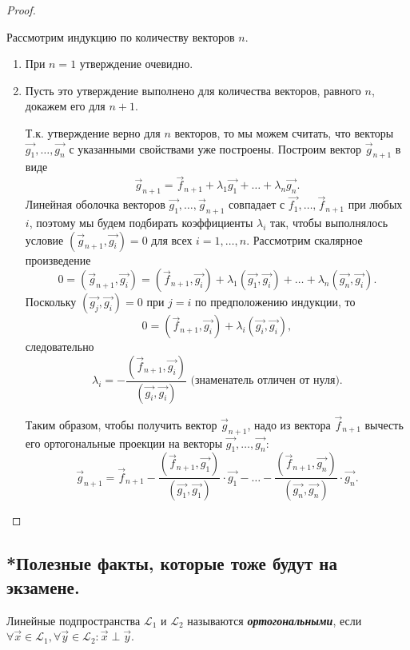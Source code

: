 \begin{proof}~

    Рассмотрим индукцию по количеству векторов $n$.
    \begin{enumerate}
        \item При $n = 1$ утверждение очевидно.
        \item Пусть это утверждение выполнено для количества векторов, равного $n$, докажем его для $n + 1$. 
        
        Т.к. утверждение верно для $n$ векторов, то мы можем считать, что векторы $\vec{g_1}, \ldots, \vec{g_n}$ с указанными свойствами уже построены. Построим вектор $\vec{g}_{n + 1}$ в виде 
        $$\vec{g}_{n + 1} = \vec{f}_{n + 1} + \lambda_1 \vec{g_1} + \ldots + \lambda_n\vec{g_n}.$$ 
        Линейная оболочка векторов $\vec{g_1}, \ldots,  \vec{g}_{n + 1}$ совпадает с $\vec{f_1}, \ldots, \vec{f}_{n + 1}$ при любых $i$, поэтому мы будем подбирать коэффициенты $\lambda_i$ так, чтобы выполнялось условие $(\vec{g}_{n + 1},  \vec{g_i}) = 0$ для всех $i = 1, \ldots, n$. Рассмотрим скалярное произведение $$0 = (\vec{g}_{n + 1}, \vec{g_i}) = (\vec{f}_{n + 1}, \vec{g_i})+ \lambda_1(\vec{g_1}, \vec{g_i}) + \ldots + \lambda_n(\vec{g_n}, \vec{g_i}).$$
        Поскольку $(\vec{g_j}, \vec{g_i}) = 0$ при $j = i$ по предположению индукции, то 
        $$0 = (\vec{f}_{n + 1}, \vec{g_i}) + \lambda_i(\vec{g_i}, \vec{g_i}),$$ следовательно 
        $$\lambda_i = -\frac{(\vec{f}_{n + 1}, \vec{g_i})}{(\vec{g_i}, \vec{g_i})} \text{ (знаменатель отличен от нуля).}$$ 
        
        Таким образом, чтобы получить вектор $\vec{g}_{n + 1}$, надо из вектора $\vec{f}_{n + 1}$ вычесть его ортогональные проекции на векторы $\vec{g_1}, \ldots, \vec{g_n}$:
        $$\vec{g}_{n + 1} = \vec{f}_{n + 1} -\frac{(\vec{f}_{n + 1}, \vec{g_1})}{(\vec{g_1}, \vec{g_1})} \cdot \vec{g_1} - \ldots -\frac{(\vec{f}_{n + 1}, \vec{g_n})}{(\vec{g_n}, \vec{g_n})} \cdot \vec{g_n}.$$
    \end{enumerate}
\end{proof}


\newpage


\subsection{*Полезные факты, которые тоже будут на экзамене.}

\begin{definition}
    Линейные подпространства $\mathcal{L}_1$ и $\mathcal{L}_2$ называются \textbf{\textit{ортогональными}}, если $\forall \vec{x} \in \mathcal{L}_1, \forall \vec{y} \in \mathcal{L}_2 \colon \vec{x} \perp \vec{y}$.
\end{definition}


